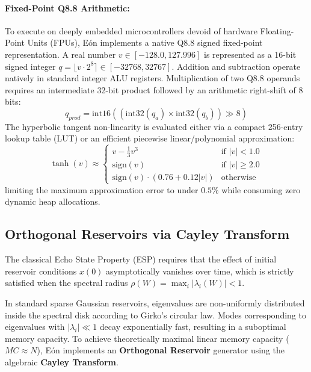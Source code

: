 \paragraph{Fixed-Point Q8.8 Arithmetic:}
To execute on deeply embedded microcontrollers devoid of hardware Floating-Point Units (FPUs), Eón implements a native Q8.8 signed fixed-point representation. A real number $v \in [-128.0, 127.996]$ is represented as a 16-bit signed integer $q = \lfloor v \cdot 2^8 \rceil \in [-32768, 32767]$. 
Addition and subtraction operate natively in standard integer ALU registers. Multiplication of two Q8.8 operands requires an intermediate 32-bit product followed by an arithmetic right-shift of $8$ bits:
\begin{equation}
    q_{prod} = \text{int16}\left( (\text{int32}(q_a) \times \text{int32}(q_b)) \gg 8 \right)
\end{equation}
The hyperbolic tangent non-linearity is evaluated either via a compact 256-entry lookup table (LUT) or an efficient piecewise linear/polynomial approximation:
\begin{equation}
    \tanh(v) \approx \begin{cases}
        v - \frac{1}{3} v^3 & \text{if } |v| < 1.0 \\
        \text{sign}(v) & \text{if } |v| \ge 2.0 \\
        \text{sign}(v) \cdot (0.76 + 0.12 |v|) & \text{otherwise}
    \end{cases}
\end{equation}
limiting the maximum approximation error to under $0.5\%$ while consuming zero dynamic heap allocations.

\subsection{Orthogonal Reservoirs via Cayley Transform}
The classical Echo State Property (ESP) requires that the effect of initial reservoir conditions $x(0)$ asymptotically vanishes over time, which is strictly satisfied when the spectral radius $\rho(W) = \max_i |\lambda_i(W)| < 1$. 

In standard sparse Gaussian reservoirs, eigenvalues are non-uniformly distributed inside the spectral disk according to Girko's circular law. Modes corresponding to eigenvalues with $|\lambda_i| \ll 1$ decay exponentially fast, resulting in a suboptimal memory capacity. To achieve theoretically maximal linear memory capacity ($MC \approx N$), Eón implements an \textbf{Orthogonal Reservoir} generator using the algebraic \textbf{Cayley Transform}. 

